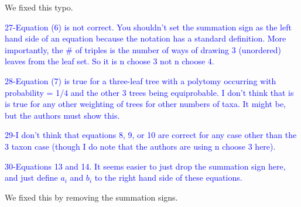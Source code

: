 \documentclass[11pt]{letter}
\begin{document}
\begin{letter}{}
We fixed this typo.


\textcolor{blue}{27-Equation (6) is not correct. You shouldn't set the summation sign as the left hand side of an equation because the notation has a standard definition. More importantly, the $\#$ of triples is the number of ways of drawing 3 (unordered) leaves from the leaf set. So it is n choose 3 not n choose 4.}



\textcolor{blue}{28-Equation (7) is true for a three-leaf tree with a polytomy occurring with probability = 1/4 and the other 3 trees being equiprobable. I don't think that is is true for any other weighting of trees for other numbers of taxa. It might be, but the authors must show this.}



\textcolor{blue}{29-I don't think that equations 8, 9, or 10 are correct for any case other than the 3 taxon case (though I do note that the authors are using n choose 3 here).}



\textcolor{blue}{30-Equations 13 and 14. It seems easier to just drop the summation sign here, and just define $a_i$ and $b_i$ to the right hand side of these equations.}

We fixed this by removing the summation signs.


\end{letter}
\end{document}
